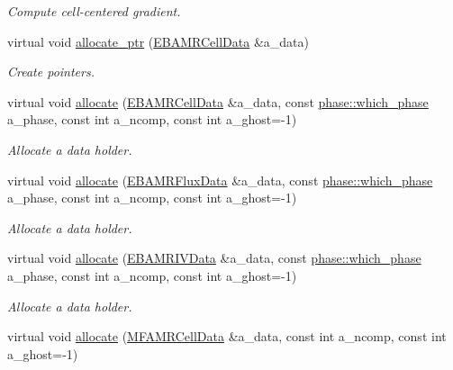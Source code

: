 \begin{DoxyCompactItemize}
\begin{DoxyCompactList}\small\item\em Compute cell-\/centered gradient. \end{DoxyCompactList}\item 
virtual void \hyperlink{classamr__mesh_a752769bd472b25663fd2a56e2522c3c2}{allocate\+\_\+ptr} (\hyperlink{type__definitions_8H_a7e610f301989e5e07781c5e338bdb7c3}{E\+B\+A\+M\+R\+Cell\+Data} \&a\+\_\+data)
\begin{DoxyCompactList}\small\item\em Create pointers. \end{DoxyCompactList}\item 
virtual void \hyperlink{classamr__mesh_afe2f2e7a2dd3909865580a030cc87b87}{allocate} (\hyperlink{type__definitions_8H_a7e610f301989e5e07781c5e338bdb7c3}{E\+B\+A\+M\+R\+Cell\+Data} \&a\+\_\+data, const \hyperlink{namespacephase_a23c76f548a5eb1955ed8c929c541108b}{phase\+::which\+\_\+phase} a\+\_\+phase, const int a\+\_\+ncomp, const int a\+\_\+ghost=-\/1)
\begin{DoxyCompactList}\small\item\em Allocate a data holder. \end{DoxyCompactList}\item 
virtual void \hyperlink{classamr__mesh_aed7822d879014c21fef071bdbb3e5b93}{allocate} (\hyperlink{type__definitions_8H_aadad278b2e5d3d4abcf9032f90ba78c3}{E\+B\+A\+M\+R\+Flux\+Data} \&a\+\_\+data, const \hyperlink{namespacephase_a23c76f548a5eb1955ed8c929c541108b}{phase\+::which\+\_\+phase} a\+\_\+phase, const int a\+\_\+ncomp, const int a\+\_\+ghost=-\/1)
\begin{DoxyCompactList}\small\item\em Allocate a data holder. \end{DoxyCompactList}\item 
virtual void \hyperlink{classamr__mesh_a435205971f7d0c16e355a381dc5d3765}{allocate} (\hyperlink{type__definitions_8H_a6b8fa905d55cbb491b52180386f0e0c1}{E\+B\+A\+M\+R\+I\+V\+Data} \&a\+\_\+data, const \hyperlink{namespacephase_a23c76f548a5eb1955ed8c929c541108b}{phase\+::which\+\_\+phase} a\+\_\+phase, const int a\+\_\+ncomp, const int a\+\_\+ghost=-\/1)
\begin{DoxyCompactList}\small\item\em Allocate a data holder. \end{DoxyCompactList}\item 
virtual void \hyperlink{classamr__mesh_a0366ed1fc0a1bc7b72d3940a8859cd97}{allocate} (\hyperlink{type__definitions_8H_aced885351d40daa466564acbee4042d3}{M\+F\+A\+M\+R\+Cell\+Data} \&a\+\_\+data, const int a\+\_\+ncomp, const int a\+\_\+ghost=-\/1)

\end{DoxyCompactItemize}

